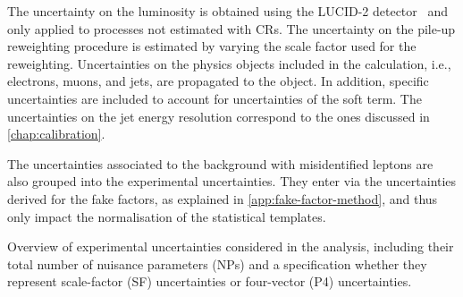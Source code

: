 The uncertainty on the luminosity is obtained using the LUCID-2 detector~\cite{ATLAS-CONF-2019-021} and only applied to processes not estimated with CRs. 
The uncertainty on the pile-up reweighting procedure is estimated by varying the scale factor used for the reweighting. 
Uncertainties on the physics objects included in the \MET calculation, i.e., electrons, muons, and jets, are propagated to the \MET object. In addition, specific \MET uncertainties are included to account for uncertainties of the \MET soft term.
The uncertainties on the jet energy resolution correspond to the ones discussed in \cref{chap:calibration}. 

The uncertainties associated to the background with misidentified leptons are also grouped into the experimental uncertainties. They enter via the uncertainties derived for the fake factors, as explained in \cref{app:fake-factor-method}, and thus only impact the normalisation of the statistical templates. 
\begin{table}[ht]
    \begin{center}
        
    \end{center}
    \caption[Overview of experimental uncertainties.]{Overview of experimental uncertainties considered in the \HWW analysis, including their total number of nuisance parameters (NPs) and a specification whether they represent scale-factor (SF) uncertainties or four-vector (P4) uncertainties.
    }
    \label{tab:exp-uncertainties}
\end{table}



